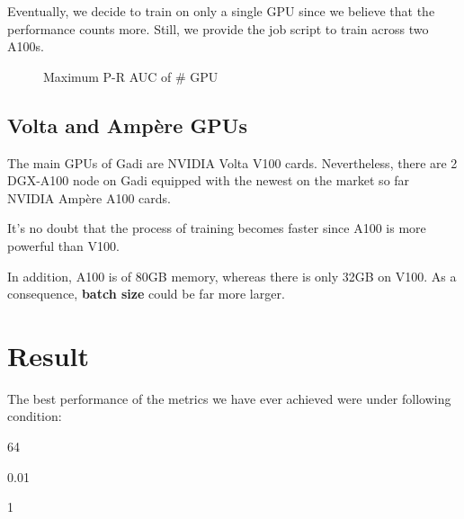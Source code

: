 \documentclass[
]{article}
\providecommand{\tightlist}{%
  \setlength{\itemsep}{0pt}\setlength{\parskip}{0pt}}
\begin{document}
Eventually, we decide to train on only a single GPU since we believe
that the performance counts more. Still, we provide the job script to
train across two A100s.

\begin{figure}[htbp]
\centering
{}
\caption{Maximum P-R AUC of \# GPU}
\end{figure}

\hypertarget{volta-and-ampuxe8re-gpus}{%
\subsection{Volta and Ampère GPUs}\label{volta-and-ampuxe8re-gpus}}

The main GPUs of Gadi are NVIDIA Volta V100 cards. Nevertheless, there
are 2 DGX-A100 node on Gadi equipped with the newest on the market so
far NVIDIA Ampère A100 cards.

It's no doubt that the process of training becomes faster since A100 is
more powerful than V100.

In addition, A100 is of 80GB memory, whereas there is only 32GB on V100.
As a consequence, \textbf{batch size} could be far more larger.

\pagebreak

\hypertarget{result}{%
\section{Result}\label{result}}

The best performance of the metrics we have ever achieved were under
following condition:

\begin{description}
\tightlist
\item[Batch Size]
64
\item[Learning Rate]
0.01
\item[\# GPU]
1
\end{description}
\end{document}

